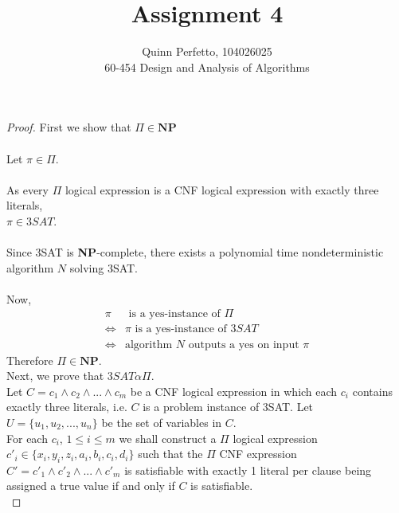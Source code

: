 \documentclass[12pt]{article}
\newenvironment{question}[2][Question]{\begin{trivlist}
\item[\hskip \labelsep {\bfseries #1}\hskip \labelsep {\bfseries #2.}]}{\end{trivlist}}
\begin{document}
\title{Assignment 4}%
\author{Quinn Perfetto, 104026025\\ %
 60-454 Design and Analysis of Algorithms} %

\maketitle

\begin{question}{1}
  \begin{proof} First we show that $\Pi \in \textbf{NP}$ \\ \\
    Let $\pi \in \Pi$. \\ \\
    As every $\Pi$ logical expression is a CNF logical expression with exactly
    three literals, \\ $\pi \in 3SAT$. \\ \\
    Since 3SAT is \textbf{NP}-complete, there exists a polynomial time nondeterministic
    algorithm $N$ solving 3SAT. \\ \\
    Now,
    \begin{align*}
      \pi  & \text{ is a yes-instance of } \Pi \\
      \iff & \pi \text{ is a yes-instance of } 3SAT \\
      \iff & \text{algorithm } N \text{ outputs a yes on input } \pi
    \end{align*}
    Therefore $\Pi \in \textbf{NP}$. \\

    Next, we prove that $3SAT \alpha \Pi$. \\

    Let $C = c_{1} \land c_{2} \land ... \land c_{m}$ be a CNF logical expression
    in which each $c_{i}$ contains exactly three literals, i.e. $C$ is a problem instance of 3SAT.
    Let $U = \{u_{1}, u_{2}, ... , u_{n}\}$ be the set of variables in $C$. \\

    For each $c_{i}$, $1 \leq i \leq m$ we shall construct a $\Pi$ logical expression
    $c'_{i} \in \{x_{i}, y_{i}, z_{i}, a_{i}, b_{i}, c_{i}, d_{i}\}$
    such that the $\Pi$ CNF expression $C' = c'_{1} \land c'_{2} \land ... \land c'_{m}$
    is satisfiable with exactly 1 literal per clause being assigned a true value
    if and only if $C$ is satisfiable. \\


\end{proof}
\end{question}
\end{document}
